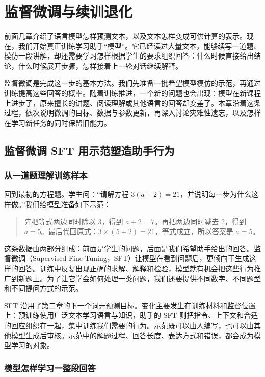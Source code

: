\chapter{监督微调与续训退化}\label{监督微调与续训退化}

前面几章介绍了语言模型怎样预测文本，以及文本怎样变成可供计算的表示。现在，我们开始真正训练学习助手“模型”。它已经读过大量文本，能够续写一道题、模仿一段讲解，却还需要学习怎样根据学生的要求组织回答：什么时候直接给出结论，什么时候展开步骤，怎样接着上一轮对话继续解释。

监督微调是完成这一步的基本方法。我们先准备一批希望模型模仿的示范，再通过训练提高这些回答的概率。随着训练推进，一个新的问题也会出现：模型在新课程上进步了，原来擅长的讲题、阅读理解或其他语言的回答却变差了。本章沿着这条过程，依次说明微调的目标、数据与参数更新，再深入讨论灾难性遗忘，以及怎样在学习新任务的同时保留旧能力。

\section{监督微调 SFT 用示范塑造助手行为}\label{监督微调 SFT 用示范塑造助手行为}

\subsection{从一道题理解训练样本}

回到最初的方程题。学生问：“请解方程 $3(a+2)=21$，并说明每一步为什么这样做。”我们给模型准备如下示范：

\begin{quote}
先把等式两边同时除以 3，得到 $a+2=7$。再把两边同时减去 2，得到 $a=5$。最后代回原式：$3\times(5+2)=21$，等式成立，所以答案是 $a=5$。
\end{quote}

这条数据由两部分组成：前面是学生的问题，后面是我们希望助手给出的回答。监督微调（Supervised Fine-Tuning，SFT）让模型在看到问题后，更倾向于生成这样的回答。训练中反复出现正确的求解、解释和检验，模型就有机会把这些行为推广到新题上。为了让它学会如何处理一类问题，我们还要提供不同数字、不同题型和不同提问方式的示范。

SFT 沿用了第二章的下一个词元预测目标。变化主要发生在训练材料和监督位置上：预训练使用广泛文本学习语言与知识，助手的 SFT 则把指令、上下文和合适的回应组织在一起，集中训练我们需要的行为。示范既可以由人编写，也可以由其他模型生成后审核。示范中的解题过程、回答长度、表达方式和错误，都会成为模型学习的对象。

\subsection{模型怎样学习一整段回答}

